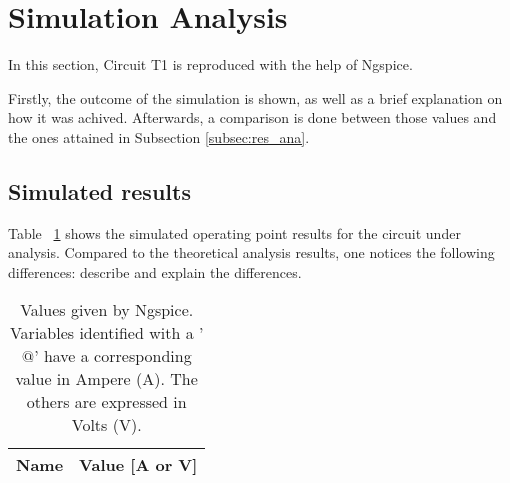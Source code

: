 \section{Simulation Analysis}
\label{sec:simulation}


In this section, Circuit T1 is reproduced with the help of Ngspice.

Firstly, the outcome of the simulation is shown, as well as a brief explanation
on how it was achived. Afterwards, a comparison is done between those values and
the ones attained in Subsection \ref{subsec:res_ana}.




\subsection{Simulated results}



Table ~\ref{tab:op} shows the simulated operating point results for the circuit
under analysis. Compared to the theoretical analysis results, one notices the
following differences: describe and explain the differences.



\begin{table}[h]
	\centering
	\begin{tabular}{|l|r|}
		\hline    
		{\bf Name} & {\bf Value [A or V]} \\ \hline
    		
	\end{tabular}
	
	\caption{Values given by Ngspice. Variables identified with a '$@$' have a
  	corresponding value in Ampere (A). The others are expressed in Volts (V).}
    
\label{tab:op}
\end{table}


